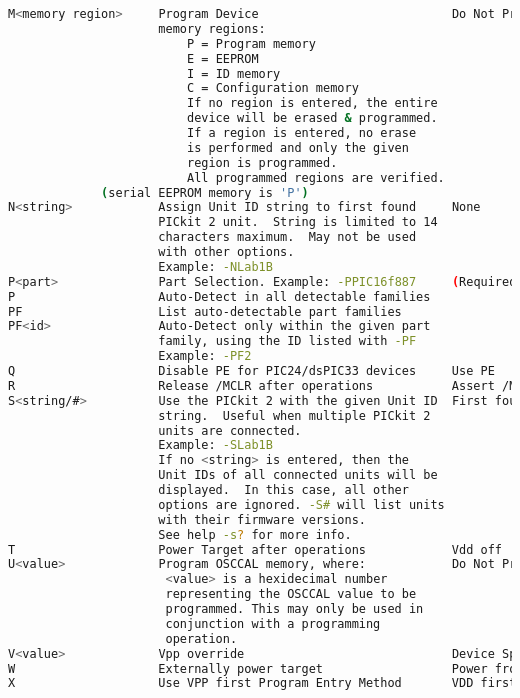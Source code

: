 \begin{center}
\begin{lstlisting}[language=bash]
M<memory region>     Program Device                           Do Not Program
                     memory regions:
                         P = Program memory
                         E = EEPROM
                         I = ID memory
                         C = Configuration memory
                         If no region is entered, the entire
                         device will be erased & programmed.
                         If a region is entered, no erase
                         is performed and only the given 
                         region is programmed.
                         All programmed regions are verified.
             (serial EEPROM memory is 'P')
N<string>            Assign Unit ID string to first found     None
                     PICkit 2 unit.  String is limited to 14
                     characters maximum.  May not be used
                     with other options.
                     Example: -NLab1B
P<part>              Part Selection. Example: -PPIC16f887     (Required)
P                    Auto-Detect in all detectable families
PF                   List auto-detectable part families
PF<id>               Auto-Detect only within the given part
                     family, using the ID listed with -PF
                     Example: -PF2
Q                    Disable PE for PIC24/dsPIC33 devices     Use PE
R                    Release /MCLR after operations           Assert /MCLR
S<string/#>          Use the PICkit 2 with the given Unit ID  First found unit
                     string.  Useful when multiple PICkit 2
                     units are connected.
                     Example: -SLab1B
                     If no <string> is entered, then the
                     Unit IDs of all connected units will be
                     displayed.  In this case, all other
                     options are ignored. -S# will list units
                     with their firmware versions.
                     See help -s? for more info.
T                    Power Target after operations            Vdd off
U<value>             Program OSCCAL memory, where:            Do Not Program
                      <value> is a hexidecimal number
                      representing the OSCCAL value to be
                      programmed. This may only be used in
                      conjunction with a programming 
                      operation.
V<value>             Vpp override                             Device Specific
W                    Externally power target                  Power from Pk2
X                    Use VPP first Program Entry Method       VDD first

\end{lstlisting}
\end{center}
